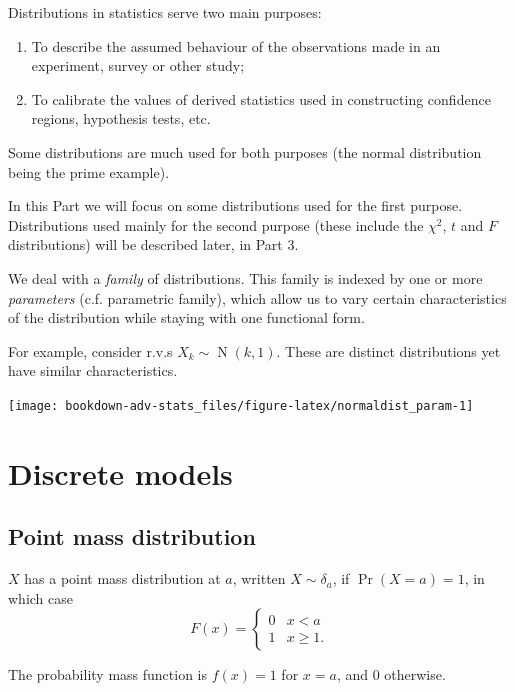 \documentclass[
]{book}
\providecommand{\tightlist}{%
  \setlength{\itemsep}{0pt}\setlength{\parskip}{0pt}}
\DeclareMathOperator{\N}{N}
\theoremstyle{definition}
\theoremstyle{definition}
\theoremstyle{definition}
\theoremstyle{definition}
\theoremstyle{remark}
\begin{document}
Distributions in statistics serve two main purposes:

\begin{enumerate}
\def\labelenumi{\arabic{enumi}.}
\tightlist
\item
  To describe the assumed behaviour of the observations made in an experiment, survey or other study;
\item
  To calibrate the values of derived statistics used in constructing confidence regions, hypothesis tests, etc.
\end{enumerate}

Some distributions are much used for both purposes (the normal distribution being the prime example).

In this Part we will focus on some distributions used for the first purpose.
Distributions used mainly for the second purpose (these include the \(\chi^2\), \(t\) and \(F\) distributions) will be described later, in Part 3.

We deal with a \emph{family} of distributions.
This family is indexed by one or more \emph{parameters} (c.f. parametric family), which allow us to vary certain characteristics of the distribution while staying with one functional form.

For example, consider r.v.s \(X_k\sim\N(k,1)\).
These are distinct distributions yet have similar characteristics.

\begin{center}\texttt{[image: bookdown-adv-stats\_files/figure-latex/normaldist\_param-1]} \end{center}

\hypertarget{discrete-models}{%
\section{Discrete models}\label{discrete-models}}

\hypertarget{point-mass-distribution}{%
\subsection{Point mass distribution}\label{point-mass-distribution}}

\(X\) has a point mass distribution at \(a\), written \(X\sim \delta_a\), if \(\Pr(X=a) = 1\), in which case
\[
F(x) = \begin{cases}
0 &x<a \\
1 &x\geq 1.
\end{cases}
\]

The probability mass function is \(f(x)=1\) for \(x=a\), and 0 otherwise.
\end{document}
